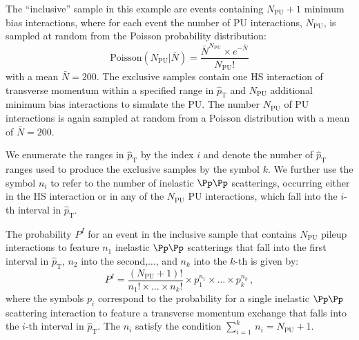 \documentclass[twocolumn,epjc3]{svjour3}
\newcommand{\pThat}{\ensuremath{\hat{p}_{\textrm{T}}}\xspace}
\newcommand{\pileup}{\ensuremath{\textrm{PU}}\xspace}
\newcommand{\Poisson}{\ensuremath{\textrm{Poisson}}\xspace}
\newcommand{\Nbar}{\ensuremath{\bar{N}}\xspace}
\begin{document}
The ``inclusive'' sample in this example are events containing $N_{\pileup} + 1$ minimum bias interactions,
where for each event the number of PU interactions, $N_{\pileup}$, is sampled at random from the Poisson probability distribution:
\begin{equation}
\Poisson(N_{\pileup} \vert \Nbar) = \frac{\Nbar^{N_{\pileup}} \times e^{-\Nbar}}{N_{\pileup}!}
\label{eq:Poisson}
\end{equation}
with a mean $\Nbar = 200$.
The exclusive samples contain one HS interaction of transverse momentum within a specified range in $\pThat$ and $N_{\pileup}$ additional minimum bias interactions to simulate the PU.
The number $N_{\pileup}$ of PU interactions is again sampled at random from a Poisson distribution with a mean of $\Nbar = 200$.

We enumerate the ranges in $\pThat$ by the index $i$ and denote the number of $\pThat$ ranges used to produce the exclusive samples by the symbol $k$.
We further use the symbol $n_{i}$ to refer to the number of inelastic $\Pp\Pp$ scatterings,
occurring either in the HS interaction or in any of the $N_{\pileup}$ PU interactions,
which fall into the $i$-th interval in $\pThat$.

The probability $P^{I}$ for an event in the inclusive sample that contains $N_{\pileup}$ pileup interactions
to feature $n_{1}$ inelastic $\Pp\Pp$ scatterings that fall into the first interval in $\pThat$, $n_{2}$ into the second,$\dots$, and $n_{k}$ into the $k$-th 
is given by:
\begin{equation}
P^{I} = \frac{(N_{\pileup} + 1)!}{n_{1}! \times \dots \times n_{k}!} \times p_{1}^{n_{1}} \times \dots \times p_{k}^{n_{k}} \, ,
\label{eq:P_inclusive}
\end{equation}
where the symbols $p_{i}$ correspond to the probability for a single inelastic $\Pp\Pp$ scattering interaction to feature a transverse momentum exchange that falls into the $i$-th interval in $\pThat$.
The $n_{i}$ satisfy the condition $\sum_{i=1}^{k} \, n_{i} = N_{\pileup} + 1$.
\end{document}
